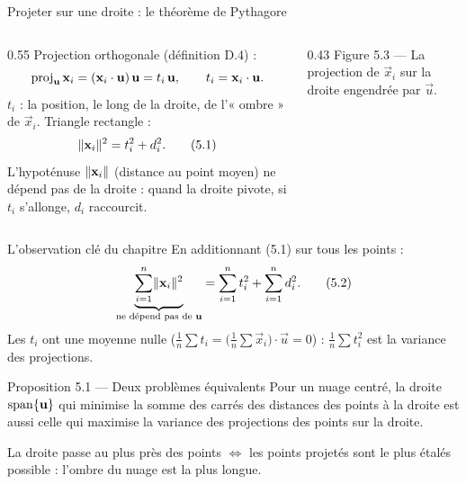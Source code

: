 \begin{frame}{Projeter sur une droite : le théorème de Pythagore}
  \begin{columns}[c]
    \begin{column}{0.55\textwidth}
      \small Projection orthogonale (définition D.4) :
      \[
        \operatorname{proj}_{\mathbf{u}}\mathbf{x}_i=(\mathbf{x}_i\cdot\mathbf{u})\,\mathbf{u}=t_i\,\mathbf{u},
        \qquad t_i=\mathbf{x}_i\cdot\mathbf{u} .
      \]
      $t_i$ : la position, le long de la droite, de l'« ombre » de
      $\vec x_i$. Triangle rectangle :
      \[
        \lVert \mathbf{x}_i \rVert^2=t_i^2+d_i^2. \tag{5.1}
      \]
      L'hypoténuse $\lVert \mathbf{x}_i \rVert$ (distance au point moyen) ne dépend pas
      de la droite : quand la droite pivote, si $t_i$ s'allonge, $d_i$
      raccourcit.
    \end{column}
    \begin{column}{0.43\textwidth}
      \scriptsize Figure 5.3 --- La projection de $\vec x_i$ sur la droite
      engendrée par $\vec u$.
    \end{column}
  \end{columns}
\end{frame}

\begin{frame}{L'observation clé du chapitre}
  En additionnant (5.1) sur tous les points :
  \[
    \underbrace{\sum_{i=1}^n\lVert \mathbf{x}_i \rVert^2}_{\text{ne dépend pas de }\mathbf{u}}
    =\sum_{i=1}^n t_i^2+\sum_{i=1}^n d_i^2 . \tag{5.2}
  \]
  Les $t_i$ ont une moyenne nulle
  ($\frac1n\sum t_i=\big(\frac1n\sum\vec x_i\big)\cdot\vec u=0$) :
  $\frac1n\sum t_i^2$ est la variance des projections.
  \begin{Enonce}{Proposition 5.1 --- Deux problèmes équivalents}
    Pour un nuage centré, la droite $\operatorname{span}\{\mathbf{u}\}$ qui minimise la somme
    des carrés des distances des points à la droite est aussi celle qui
    maximise la variance des projections des points sur la droite.
  \end{Enonce}
  \small La droite passe au plus près des points $\iff$ les points
  projetés sont le plus étalés possible : l'ombre du nuage est la plus
  longue.
\end{frame}

